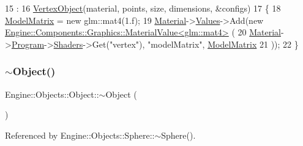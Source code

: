 \begin{DoxyCode}
15                                                                                                            
                                                                  :
16     \mbox{\hyperlink{classEngine_1_1Components_1_1Objects_1_1VertexObject_a2cd67c7ea4baefd945c5045d2a775a5d}{VertexObject}}(material, points, size, dimensions, &configs)
17 \{
18     \mbox{\hyperlink{classEngine_1_1Objects_1_1Object_acf41cc091fa270053245ed26bc28c8a4}{ModelMatrix}} = \textcolor{keyword}{new} glm::mat4(1.f);
19     \mbox{\hyperlink{classEngine_1_1Components_1_1Objects_1_1VertexObject_a86c1fced4cdc5e59a66a635390a17eca}{Material}}->\mbox{\hyperlink{classEngine_1_1Components_1_1Graphics_1_1Material_a34335608ba1e6eb2c2dba5032107eab0}{Values}}->Add(\textcolor{keyword}{new} 
      \mbox{\hyperlink{classEngine_1_1Components_1_1Graphics_1_1MaterialValue}{Engine::Components::Graphics::MaterialValue<glm::mat4>}}
      (
20         \mbox{\hyperlink{classEngine_1_1Components_1_1Objects_1_1VertexObject_a86c1fced4cdc5e59a66a635390a17eca}{Material}}->\mbox{\hyperlink{classEngine_1_1Components_1_1Graphics_1_1Material_a2a4084db93bb70cd65032baf296803d6}{Program}}->\mbox{\hyperlink{classEngine_1_1Components_1_1Graphics_1_1Program_aff39fa56fc1fab1bce6c8a5ce29ae161}{Shaders}}->Get(\textcolor{stringliteral}{"vertex"}), \textcolor{stringliteral}{"modelMatrix"}, 
      \mbox{\hyperlink{classEngine_1_1Objects_1_1Object_acf41cc091fa270053245ed26bc28c8a4}{ModelMatrix}}
21     ));
22 \}
\end{DoxyCode}
\mbox{\label{classEngine_1_1Objects_1_1Object_a5fc9cc004cae8e63c4fb1d2b6d1cea88}} 
\subsubsection{\texorpdfstring{$\sim$\+Object()}{~Object()}}
{\footnotesize\ttfamily Engine\+::\+Objects\+::\+Object\+::$\sim$\+Object (\begin{DoxyParamCaption}{ }\end{DoxyParamCaption})\hspace{0.3cm}{\ttfamily [default]}}



Referenced by Engine\+::\+Objects\+::\+Sphere\+::$\sim$\+Sphere().

